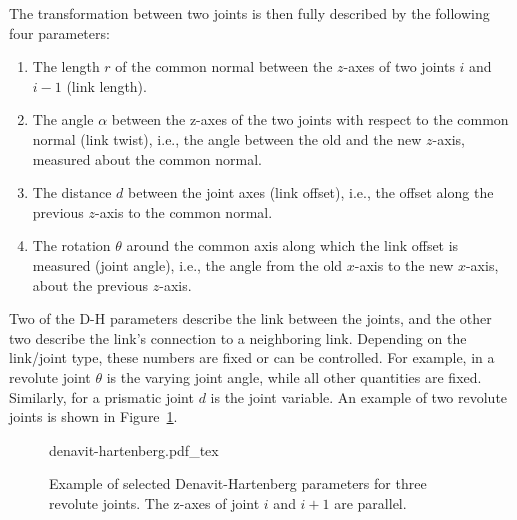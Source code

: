 The transformation between two joints is then fully described by the following four parameters:
\begin{enumerate}
\item The length $ r$ of the common normal between the $z$-axes of two joints $i$ and $i-1$ (link length).
\item The angle $ \alpha$ between the z-axes of the two joints with respect to the common normal (link twist), i.e., the angle between the old and the new $z$-axis, measured about the common normal.
\item The distance $d$ between the joint axes (link offset), i.e., the offset along the previous $z$-axis to the common normal.
\item The rotation $ \theta$ around the common axis along which the link offset is measured (joint angle), i.e., the angle from the old $x$-axis to the new $x$-axis, about the previous $z$-axis.
\end{enumerate}

Two of the D-H parameters describe the link between the joints, and the other two describe the link's connection to a neighboring link. Depending on the link/joint type, these numbers are fixed or can be controlled. For example, in a revolute joint $ \theta$ is the varying joint angle, while all other quantities are fixed.  Similarly, for a prismatic joint $ d$ is the joint variable. An example of two revolute joints is shown in Figure~\ref{fig:denavit}.

\begin{figure}
    \centering
    \def\svgwidth{\textwidth}
    {denavit-hartenberg.pdf_tex}
    \caption{Example of selected Denavit-Hartenberg parameters for three revolute joints. The z-axes of joint $i$ and $i+1$ are parallel.}
    \label{fig:denavit}
\end{figure}



